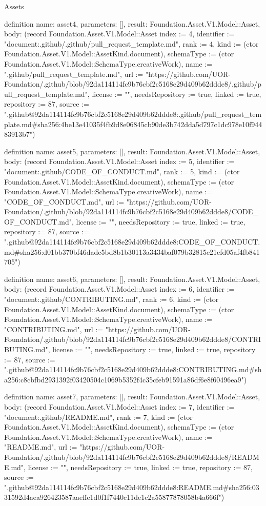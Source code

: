 \begin{lexlean}{Assets}
\begin{semanticmodule}
definition{
  name: asset4,
  parameters: [],
  result: Foundation.Asset.V1.Model::Asset,
  body: (record Foundation.Asset.V1.Model::Asset {index := 4, identifier := "document:.github/.github/pull_request_template.md", rank := 4, kind := (ctor Foundation.Asset.V1.Model::AssetKind.document), schemaType := (ctor Foundation.Asset.V1.Model::SchemaType.creativeWork), name := ".github/pull_request_template.md", url := "https://github.com/UOR-Foundation/.github/blob/92da114114fc9b76cbf2c5168e29d409b62ddde8/.github/pull_request_template.md", license := "", needsRepository := true, linked := true, repository := 87, source := ".github@92da114114fc9b76cbf2c5168e29d409b62ddde8:.github/pull_request_template.md#sha256:4be13e41035f4fb9d8e06845cb90de3b742dda5d797c1dc978e10f94483913b7"})
}

definition{
  name: asset5,
  parameters: [],
  result: Foundation.Asset.V1.Model::Asset,
  body: (record Foundation.Asset.V1.Model::Asset {index := 5, identifier := "document:.github/CODE_OF_CONDUCT.md", rank := 5, kind := (ctor Foundation.Asset.V1.Model::AssetKind.document), schemaType := (ctor Foundation.Asset.V1.Model::SchemaType.creativeWork), name := "CODE_OF_CONDUCT.md", url := "https://github.com/UOR-Foundation/.github/blob/92da114114fc9b76cbf2c5168e29d409b62ddde8/CODE_OF_CONDUCT.md", license := "", needsRepository := true, linked := true, repository := 87, source := ".github@92da114114fc9b76cbf2c5168e29d409b62ddde8:CODE_OF_CONDUCT.md#sha256:d01bb370bf46dadc5bd8b1b30113a3434baf079b32815e21cfd05af4fb841705"})
}

definition{
  name: asset6,
  parameters: [],
  result: Foundation.Asset.V1.Model::Asset,
  body: (record Foundation.Asset.V1.Model::Asset {index := 6, identifier := "document:.github/CONTRIBUTING.md", rank := 6, kind := (ctor Foundation.Asset.V1.Model::AssetKind.document), schemaType := (ctor Foundation.Asset.V1.Model::SchemaType.creativeWork), name := "CONTRIBUTING.md", url := "https://github.com/UOR-Foundation/.github/blob/92da114114fc9b76cbf2c5168e29d409b62ddde8/CONTRIBUTING.md", license := "", needsRepository := true, linked := true, repository := 87, source := ".github@92da114114fc9b76cbf2c5168e29d409b62ddde8:CONTRIBUTING.md#sha256:c8cbfbd2931392f03420504c1069b5352f4c35cfeb91591a86df6e8f60496ea9"})
}

definition{
  name: asset7,
  parameters: [],
  result: Foundation.Asset.V1.Model::Asset,
  body: (record Foundation.Asset.V1.Model::Asset {index := 7, identifier := "document:.github/README.md", rank := 7, kind := (ctor Foundation.Asset.V1.Model::AssetKind.document), schemaType := (ctor Foundation.Asset.V1.Model::SchemaType.creativeWork), name := "README.md", url := "https://github.com/UOR-Foundation/.github/blob/92da114114fc9b76cbf2c5168e29d409b62ddde8/README.md", license := "", needsRepository := true, linked := true, repository := 87, source := ".github@92da114114fc9b76cbf2c5168e29d409b62ddde8:README.md#sha256:0331592d4aea926423587aaeffe1d0f1f7440c11de1c2a55877878058b4a666f"})
}


\end{semanticmodule}
\end{lexlean}
